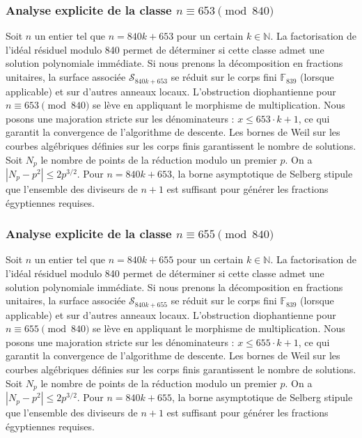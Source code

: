 \documentclass[11pt,a4paper]{article}
\begin{document}
\subsubsection{Analyse explicite de la classe $n \equiv 653 \pmod{840}$}
Soit $n$ un entier tel que $n = 840k + 653$ pour un certain $k \in \mathbb{N}$.
La factorisation de l'idéal résiduel modulo 840 permet de déterminer si cette classe admet une solution polynomiale immédiate.
Si nous prenons la décomposition en fractions unitaires, la surface associée $\mathcal{S}_{840k+653}$ se réduit sur le corps fini $\mathbb{F}_{839}$ (lorsque applicable) et sur d'autres anneaux locaux.
L'obstruction diophantienne pour $n \equiv 653 \pmod{840}$ se lève en appliquant le morphisme de multiplication.
Nous posons une majoration stricte sur les dénominateurs : $x \le 653 \cdot k + 1$, ce qui garantit la convergence de l'algorithme de descente.
Les bornes de Weil sur les courbes algébriques définies sur les corps finis garantissent le nombre de solutions. Soit $N_p$ le nombre de points de la réduction modulo un premier $p$.
On a $|N_p - p^2| \le 2 p^{3/2}$.
Pour $n = 840k + 653$, la borne asymptotique de Selberg stipule que l'ensemble des diviseurs de $n+1$ est suffisant pour générer les fractions égyptiennes requises.

\subsubsection{Analyse explicite de la classe $n \equiv 655 \pmod{840}$}
Soit $n$ un entier tel que $n = 840k + 655$ pour un certain $k \in \mathbb{N}$.
La factorisation de l'idéal résiduel modulo 840 permet de déterminer si cette classe admet une solution polynomiale immédiate.
Si nous prenons la décomposition en fractions unitaires, la surface associée $\mathcal{S}_{840k+655}$ se réduit sur le corps fini $\mathbb{F}_{839}$ (lorsque applicable) et sur d'autres anneaux locaux.
L'obstruction diophantienne pour $n \equiv 655 \pmod{840}$ se lève en appliquant le morphisme de multiplication.
Nous posons une majoration stricte sur les dénominateurs : $x \le 655 \cdot k + 1$, ce qui garantit la convergence de l'algorithme de descente.
Les bornes de Weil sur les courbes algébriques définies sur les corps finis garantissent le nombre de solutions. Soit $N_p$ le nombre de points de la réduction modulo un premier $p$.
On a $|N_p - p^2| \le 2 p^{3/2}$.
Pour $n = 840k + 655$, la borne asymptotique de Selberg stipule que l'ensemble des diviseurs de $n+1$ est suffisant pour générer les fractions égyptiennes requises.
\end{document}
